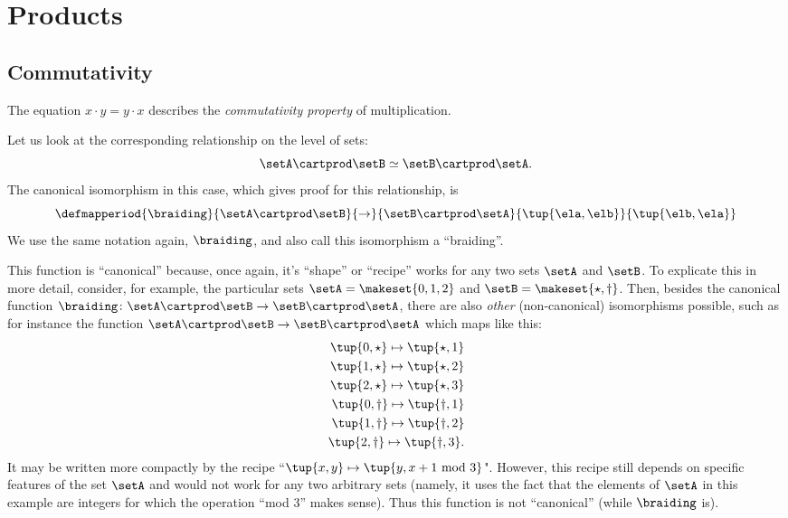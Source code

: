 


\section{Products}
\label{sec:arithmetic-products}


\subsection{Commutativity}


The equation $x \cdot y = y \cdot x$ describes the \emph{commutativity property} of multiplication.

Let us look at the corresponding relationship on the level of sets:
\begin{equation}\label{eq:mult-commutativity-sets}
    \setA \cartprod \setB \simeq \setB \cartprod \setA.
\end{equation}
The canonical isomorphism in this case, which gives proof for this relationship, is
\begin{equation}\label{eq:braiding-sets}
    \defmapperiod{
        \braiding
    }{
        \setA \cartprod \setB
    }{
        \to
    }{
        \setB \cartprod \setA
    }{
        \tup{\ela, \elb}
    }{
        \tup{\elb, \ela}
    }
\end{equation}
We use the same notation again, $\braiding$, and also call this isomorphism a ``braiding''.

This function is ``canonical'' because, once again, it's ``shape'' or ``recipe'' works for any two sets $\setA$ and $\setB$.
To explicate this in more detail, consider, for example, the particular sets $\setA = \makeset{0, 1, 2}$ and $\setB = \makeset{\star, \dagger}$.
Then, besides the canonical function $\braiding \colon \setA \cartprod \setB \to \setB \cartprod \setA$, there are also \emph{other} (non-canonical) isomorphisms possible, such as for instance the function $\setA \cartprod \setB \to \setB \cartprod \setA$ which maps like this:
\begin{align}\label{eq:noncanonical-braiding}
    \tup{0, \star} \mapsto \tup{\star, 1} \\
    \tup{1, \star} \mapsto \tup{\star, 2} \\
    \tup{2, \star} \mapsto \tup{\star, 3} \\
    \tup{0, \dagger} \mapsto \tup{\dagger, 1} \\
    \tup{1, \dagger} \mapsto \tup{\dagger, 2} \\
    \tup{2, \dagger} \mapsto \tup{\dagger, 3}.
\end{align}
It may be written more compactly by the recipe ``$\tup{x, y} \mapsto \tup{y, x +1 \text{ mod } 3}$".
However, this recipe still depends on specific features of the set $\setA$ and would not work for any two arbitrary sets (namely, it uses the fact that the elements of $\setA$ in this example are integers for which the operation ``mod 3'' makes sense).
Thus this function is not ``canonical'' (while $\braiding$ is).


